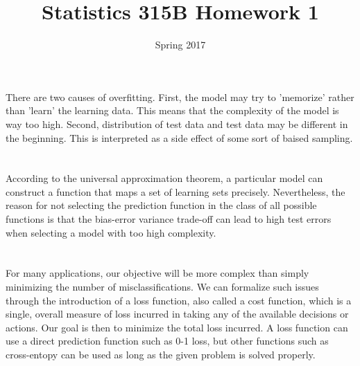 \documentclass[11pt,a4paper]{article}
\begin{document}
\title{Statistics 315B Homework 1}
\author{Spring 2017}

\maketitle

\section{}

\section{}

\section{}

There are two causes of overfitting. First, the model may try to 'memorize' rather than 'learn' the learning data. This means that the complexity of the model is way too high. Second, distribution of test data and test data may be different in the beginning. This is interpreted as a side effect of some sort of baised sampling.

\section{}

According to the universal approximation theorem, a particular model can construct a function that maps a set of learning sets precisely. Nevertheless, the reason for not selecting the prediction function in the class of all possible functions is that the bias-error variance trade-off can lead to high test errors when selecting a model with too high complexity.

\section{}

For many applications, our objective will be more complex than simply minimizing the number of misclassifications. We can formalize such issues through the introduction of a loss function, also called a cost function, which is a single, overall measure of loss incurred in taking any of the available decisions or actions. Our goal is then to minimize the total loss incurred. A loss function can use a direct prediction function such as 0-1 loss, but other functions such as cross-entopy can be used as long as the given problem is solved properly.
\end{document}
